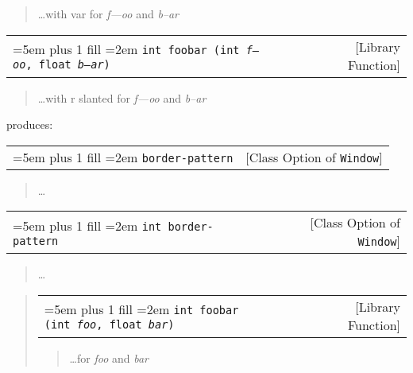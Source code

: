 \documentclass{book}
\newcommand\GNUTexinfocommandstyletextvar[1]{{\normalfont{}\textsl{#1}}}%
\begin{document}
%
\begin{quote}
\unskip{\parskip=0pt\noindent}%
\dots{}\@ with var for \GNUTexinfocommandstyletextvar{f---oo} and \GNUTexinfocommandstyletextvar{b--ar}
\end{quote}


\noindent\begin{tabularx}{\linewidth}{@{}Xr}
\rightskip=5em plus 1 fill
\hangindent=2em
\noindent\texttt{int foobar (int\ \textnormal{\textsl{f---oo}},\ float\ \textnormal{\textsl{b--ar}})}& [Library Function]
\end{tabularx}

%
\begin{quote}
\unskip{\parskip=0pt\noindent}%
\dots{}\@ with r slanted for \GNUTexinfocommandstyletextvar{f---oo} and \GNUTexinfocommandstyletextvar{b--ar}
\end{quote}

\noindent{}produces:

\noindent\begin{tabularx}{\linewidth}{@{}Xr}
\rightskip=5em plus 1 fill
\hangindent=2em
\noindent\texttt{border-pattern}& [Class Option of \texttt{Window}]
\end{tabularx}

%
\begin{quote}
\unskip{\parskip=0pt\noindent}%
\dots{}\@
\end{quote}


\noindent\begin{tabularx}{\linewidth}{@{}Xr}
\rightskip=5em plus 1 fill
\hangindent=2em
\noindent\texttt{\texttt{int} border-pattern}& [Class Option of \texttt{Window}]
\end{tabularx}

%
\begin{quote}
\unskip{\parskip=0pt\noindent}%
\dots{}\@
\end{quote}

\begin{quote}

\noindent\begin{tabularx}{\linewidth}{@{}Xr}
\rightskip=5em plus 1 fill
\hangindent=2em
\noindent\texttt{int foobar (int\ \GNUTexinfocommandstyletextvar{foo},\ float\ \GNUTexinfocommandstyletextvar{bar})}& [Library Function]
\end{tabularx}

%
\begin{quote}
\unskip{\parskip=0pt\noindent}%
\dots{}\@ for \GNUTexinfocommandstyletextvar{foo} and \GNUTexinfocommandstyletextvar{bar}
\end{quote}
\end{quote}
\end{document}
